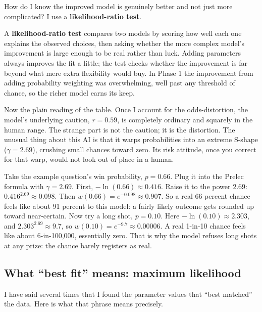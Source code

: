 \documentclass[11pt]{article}
\newcommand{\term}[1]{\textbf{\color{mossdk}#1}}
\begin{document}
How do I know the improved model is genuinely better and not just more complicated? I use a
\term{likelihood-ratio test}.

\begin{defbox}
A \term{likelihood-ratio test} compares two models by scoring how well each one explains the observed
choices, then asking whether the more complex model's improvement is large enough to be real rather
than luck. Adding parameters always improves the fit a little; the test checks whether the improvement
is far beyond what mere extra flexibility would buy. In Phase 1 the improvement from adding probability
weighting was overwhelming, well past any threshold of chance, so the richer model earns its keep.
\end{defbox}

Now the plain reading of the table. Once I account for the odds-distortion, the model's underlying
caution, $r = 0.59$, is completely ordinary and squarely in the human range. The strange part is not
the caution; it is the distortion. The unusual thing about this AI is that it warps probabilities into
an extreme S-shape ($\gamma = 2.69$), crushing small chances toward zero. Its risk attitude, once you
correct for that warp, would not look out of place in a human.

\begin{workbox}[What $\gamma = 2.69$ does to a real chance]
Take the example question's win probability, $p = 0.66$. Plug it into the Prelec formula with
$\gamma = 2.69$. First, $-\ln(0.66) \approx 0.416$. Raise it to the power $2.69$:
$0.416^{2.69} \approx 0.098$. Then $w(0.66) = e^{-0.098} \approx 0.907$. So a real 66 percent chance
feels like about 91 percent to this model: a fairly likely outcome gets rounded up toward near-certain.
Now try a long shot, $p = 0.10$. Here $-\ln(0.10) \approx 2.303$, and $2.303^{2.69} \approx 9.7$, so
$w(0.10) = e^{-9.7} \approx 0.00006$. A real 1-in-10 chance feels like about 6-in-100,000, essentially
zero. That is why the model refuses long shots at any prize: the chance barely registers as real.
\end{workbox}

\subsection{What ``best fit'' means: maximum likelihood}

I have said several times that I found the parameter values that ``best matched'' the data. Here is what
that phrase means precisely.
\end{document}
